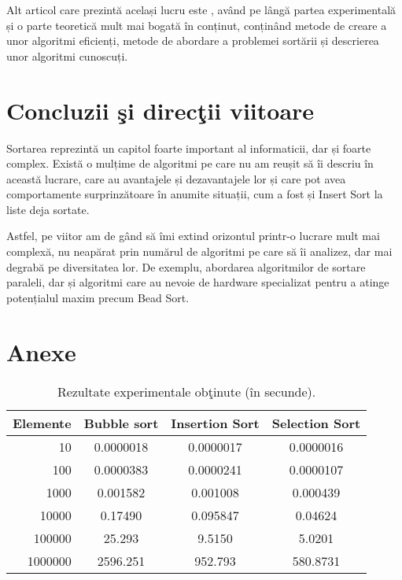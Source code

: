 \documentclass[12pt]{article}
\begin{document}
Alt articol care prezintă același lucru este \cite{hammad2015comparative}, având pe lângă partea experimentală și o parte
teoretică mult mai bogată în conținut, conținând metode de creare a unor algoritmi eficienți,
metode de abordare a problemei sortării și descrierea unor algoritmi cunoscuți.

\section{Concluzii şi direcţii viitoare}

Sortarea reprezintă un capitol foarte important al informaticii, dar și foarte complex. Există
o mulțime de algoritmi pe care nu am reușit să îi descriu în această lucrare, care au avantajele și dezavantajele
lor și care pot avea comportamente surprinzătoare în anumite situații, cum a fost și Insert Sort
la liste deja sortate.

Astfel, pe viitor am de gând să îmi extind orizontul printr-o lucrare mult mai complexă, nu neapărat prin numărul de algoritmi
pe care să îi analizez, dar mai degrabă pe diversitatea lor. De exemplu, abordarea algoritmilor de sortare
paraleli, dar și algoritmi care au nevoie de hardware specializat pentru a atinge potențialul maxim precum Bead Sort.

\pagebreak



\pagebreak

\section{Anexe}

\begin{table}[h!]
    \centering
    \begin{tabular}{ ||r| c| c| c|| }
\hline\hline
  Elemente & Bubble sort & Insertion Sort & Selection Sort  \\
  \hline
10  & 0.0000018 & 0.0000017 & 0.0000016 \\
100  & 0.0000383 & 0.0000241 & 0.0000107 \\
1000  & 0.001582 & 0.001008 & 0.000439\\
10000  & 0.17490 & 0.095847 & 0.04624 \\
100000  & 25.293 & 9.5150 & 5.0201 \\
1000000  & 2596.251  & 952.793 & 580.8731 \\
\hline\hline
\end{tabular}
    \caption{Rezultate experimentale obţinute (în secunde).}
\end{table}
\end{document}
